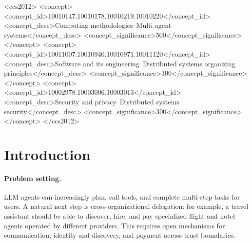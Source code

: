 \documentclass[sigconf]{acmart}
\begin{document}
\begin{CCSXML}
<ccs2012>
   <concept>
       <concept_id>10010147.10010178.10010219.10010220</concept_id>
       <concept_desc>Computing methodologies~Multi-agent systems</concept_desc>
       <concept_significance>500</concept_significance>
       </concept>
   <concept>
       <concept_id>10011007.10010940.10010971.10011120</concept_id>
       <concept_desc>Software and its engineering~Distributed systems organizing principles</concept_desc>
       <concept_significance>300</concept_significance>
       </concept>
   <concept>
       <concept_id>10002978.10003006.10003013</concept_id>
       <concept_desc>Security and privacy~Distributed systems security</concept_desc>
       <concept_significance>300</concept_significance>
       </concept>
 </ccs2012>
\end{CCSXML}



\maketitle

\section{Introduction}
\label{sec:introduction}

\paragraph{Problem setting.}
LLM agents can increasingly plan, call tools, and complete multi-step
tasks for users. A natural next step is cross-organizational delegation:
for example, a travel assistant should be able to discover, hire, and
pay specialized flight and hotel agents operated by different providers.
This requires open mechanisms for communication, identity and discovery,
and payment across trust boundaries.
\end{document}
